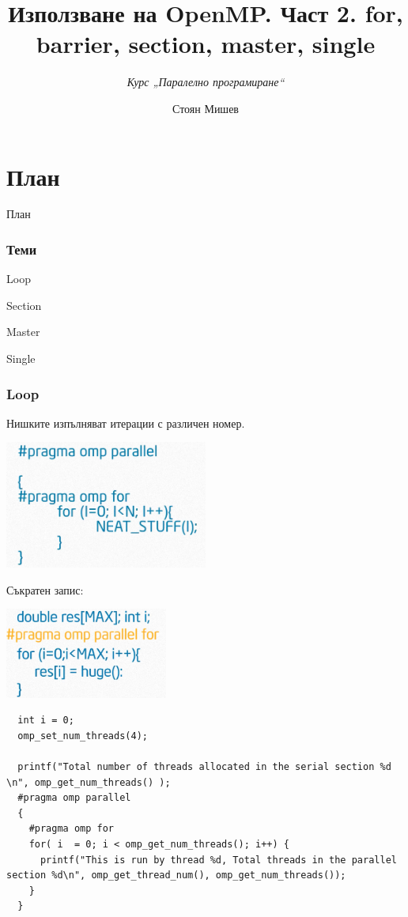 \documentclass{beamer}
\title{Използване на OpenMP. Част 2. for, barrier, section, master, single }
\subtitle{\textit{Курс „Паралелно програмиране“}}
\author{\newline \newline Стоян Мишев}
\date{} %
\begin{document}
\lstset{language=Python}
{ 
\frame{\titlepage}}


\section*{План}\begin{frame}{План}\tableofcontents\end{frame}


\begin{frame}
\frametitle{Теми}
  Loop

  Section

  Master
  
  Single
\end{frame}


\begin{frame}
  \frametitle{Loop}
  Нишките изпълняват итерации с различен номер.

  \centering
  \includegraphics[width=0.5\textwidth]{for}  \pause

  Съкратен запис:

  \includegraphics[width=0.4\textwidth]{for-short}
\end{frame}

\begin{frame}
\scriptsize
\lstset{language=C++}
\begin{lstlisting}
  int i = 0;
  omp_set_num_threads(4);

  printf("Total number of threads allocated in the serial section %d \n", omp_get_num_threads() );
  #pragma omp parallel 
  {
    #pragma omp for
    for( i  = 0; i < omp_get_num_threads(); i++) {
      printf("This is run by thread %d, Total threads in the parallel section %d\n", omp_get_thread_num(), omp_get_num_threads());
    }
  }
\end{lstlisting}
\end{frame}
\end{document}
